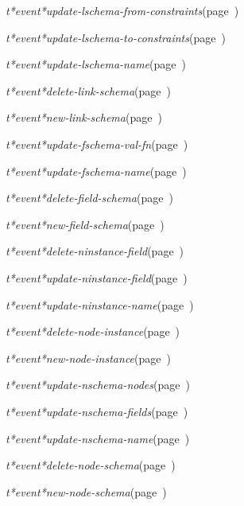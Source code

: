 \begin{description}
\item {\sl t*event*update-lschema-from-constraints}\hfill(page~\pageref{t*event*update-lschema-from-constraints})
\item {\sl t*event*update-lschema-to-constraints}\hfill(page~\pageref{t*event*update-lschema-to-constraints})
\item {\sl t*event*update-lschema-name}\hfill(page~\pageref{t*event*update-lschema-name})
\item {\sl t*event*delete-link-schema}\hfill(page~\pageref{t*event*delete-link-schema})
\item {\sl t*event*new-link-schema}\hfill(page~\pageref{t*event*new-link-schema})
\item {\sl t*event*update-fschema-val-fn}\hfill(page~\pageref{t*event*update-fschema-val-fn})
\item {\sl t*event*update-fschema-name}\hfill(page~\pageref{t*event*update-fschema-name})
\item {\sl t*event*delete-field-schema}\hfill(page~\pageref{t*event*delete-field-schema})
\item {\sl t*event*new-field-schema}\hfill(page~\pageref{t*event*new-field-schema})
\item {\sl t*event*delete-ninstance-field}\hfill(page~\pageref{t*event*delete-ninstance-field})
\item {\sl t*event*update-ninstance-field}\hfill(page~\pageref{t*event*update-ninstance-field})
\item {\sl t*event*update-ninstance-name}\hfill(page~\pageref{t*event*update-ninstance-name})
\item {\sl t*event*delete-node-instance}\hfill(page~\pageref{t*event*delete-node-instance})
\item {\sl t*event*new-node-instance}\hfill(page~\pageref{t*event*new-node-instance})
\item {\sl t*event*update-nschema-nodes}\hfill(page~\pageref{t*event*update-nschema-nodes})
\item {\sl t*event*update-nschema-fields}\hfill(page~\pageref{t*event*update-nschema-fields})
\item {\sl t*event*update-nschema-name}\hfill(page~\pageref{t*event*update-nschema-name})
\item {\sl t*event*delete-node-schema}\hfill(page~\pageref{t*event*delete-node-schema})
\item {\sl t*event*new-node-schema}\hfill(page~\pageref{t*event*new-node-schema})

























\end{description}
\horizontalline


